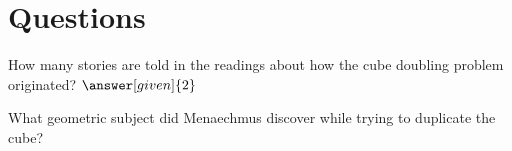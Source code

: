 \documentclass{ximera}
\begin{document}
\section{Questions}

\begin{question}
How many stories are told in the readings about how the cube doubling problem originated?  $\answer[given]{2}$
\end{question}



\begin{question}
What geometric subject did Menaechmus discover while trying to duplicate the cube?
\begin{multipleChoice}
\end{multipleChoice}
\end{question}


\end{document}
